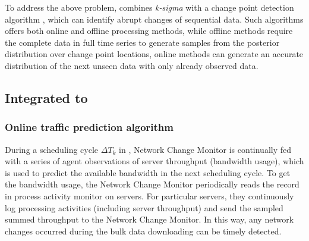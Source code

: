 {%
To address the above problem, \name combines \textit{k-sigma} with a change point detection algorithm \cite{adams2007bayesian}, which can identify abrupt changes of sequential data. Such algorithms offers both online and offline processing methods, while offline methods \cite{smith1975bayesian,stephens1994bayesian,barry1993bayesian,green1995reversible} require the complete data in full time series to generate samples from the posterior distribution over change point locations, online methods \cite{page1955test,desobry2005online,lorden1971procedures} can generate an accurate distribution of the next unseen data with only already observed data. 

\subsection{Integrated to \bdsname}
\subsubsection{Online traffic prediction algorithm}


During a scheduling cycle $\Delta T_k$ in \name, Network Change Monitor is continually fed with a series of agent observations of server throughput (bandwidth usage), which is used to predict the available bandwidth in the next scheduling cycle. To get the bandwidth usage, the Network Change Monitor periodically reads the record in process activity monitor on servers. For particular servers, they continuously log processing activities (including server throughput) and send the sampled summed throughput to the Network Change Monitor. In this way, any network changes occurred during the bulk data downloading can be timely detected.

}
